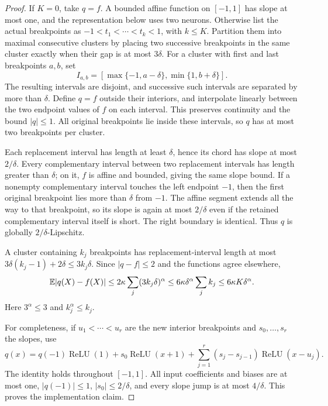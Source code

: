 \begin{proof}
If $K=0$, take $q=f$. A bounded affine function on $[-1,1]$ has slope
at most one, and the representation below uses two neurons.
Otherwise list the actual breakpoints as
$-1<t_1<\cdots<t_k<1$, with $k\le K$. Partition them into maximal
consecutive clusters by placing two successive breakpoints in the
same cluster exactly when their gap is at most $3\delta$.
For a cluster with first and last breakpoints $a,b$, set
\[
 I_{a,b}=[\max\{-1,a-\delta\},\min\{1,b+\delta\}].
\]
The resulting intervals are disjoint, and successive such intervals
are separated by more than $\delta$. Define $q=f$ outside their
interiors, and interpolate linearly between the two endpoint values
of $f$ on each interval. This preserves continuity and the bound
$|q|\le1$. All original breakpoints lie inside these intervals, so
$q$ has at most two breakpoints per cluster.

Each replacement interval has length at least $\delta$, hence its
chord has slope at most $2/\delta$. Every complementary interval
between two replacement intervals has length greater than $\delta$;
on it, $f$ is affine and bounded, giving the same slope bound.
If a nonempty complementary interval touches the left endpoint
$-1$, then the first original breakpoint lies more than $\delta$
from $-1$. The affine segment extends all the way to that breakpoint,
so its slope is again at most $2/\delta$ even if the retained
complementary interval itself is short. The right boundary is
identical. Thus $q$ is globally $2/\delta$-Lipschitz.

A cluster containing $k_j$ breakpoints has replacement-interval
length at most
$3\delta(k_j-1)+2\delta\le3k_j\delta$.
Since $|q-f|\le2$ and the functions agree elsewhere,
\[
 \mathbb E|q(X)-f(X)|
 \le 2\kappa\sum_j(3k_j\delta)^\alpha
 \le 6\kappa\delta^\alpha\sum_j k_j
 \le 6\kappa K\delta^\alpha.
\]
Here $3^\alpha\le3$ and $k_j^\alpha\le k_j$.

For completeness, if $u_1<\cdots<u_r$ are the new interior
breakpoints and $s_0,\ldots,s_r$ the slopes, use
\[
 q(x)=q(-1)\operatorname{ReLU}(1)
       +s_0\operatorname{ReLU}(x+1)
       +\sum_{j=1}^r(s_j-s_{j-1})\operatorname{ReLU}(x-u_j).
\]
The identity holds throughout $[-1,1]$. All input coefficients and
biases are at most one, $|q(-1)|\le1$, $|s_0|\le2/\delta$, and every
slope jump is at most $4/\delta$. This proves the implementation claim.
\end{proof}

